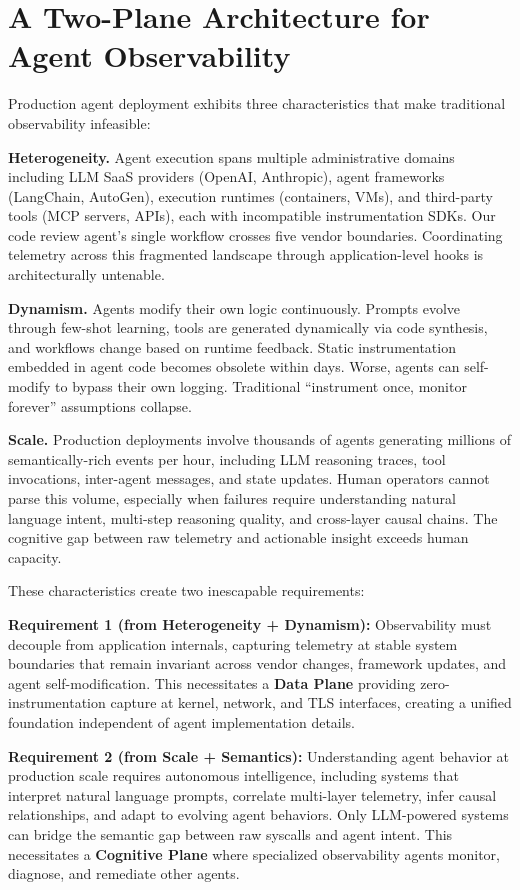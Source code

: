 \documentclass[sigplan,screen,9pt]{acmart}
\begin{document}
\section{A Two-Plane Architecture for Agent Observability}

Production agent deployment exhibits three characteristics that make traditional observability infeasible:

\textbf{Heterogeneity.} Agent execution spans multiple administrative domains including LLM SaaS providers (OpenAI, Anthropic), agent frameworks (LangChain, AutoGen), execution runtimes (containers, VMs), and third-party tools (MCP servers, APIs), each with incompatible instrumentation SDKs. Our code review agent's single workflow crosses five vendor boundaries. Coordinating telemetry across this fragmented landscape through application-level hooks is architecturally untenable.

\textbf{Dynamism.} Agents modify their own logic continuously. Prompts evolve through few-shot learning, tools are generated dynamically via code synthesis, and workflows change based on runtime feedback. Static instrumentation embedded in agent code becomes obsolete within days. Worse, agents can self-modify to bypass their own logging. Traditional ``instrument once, monitor forever'' assumptions collapse.

\textbf{Scale.} Production deployments involve thousands of agents generating millions of semantically-rich events per hour, including LLM reasoning traces, tool invocations, inter-agent messages, and state updates. Human operators cannot parse this volume, especially when failures require understanding natural language intent, multi-step reasoning quality, and cross-layer causal chains. The cognitive gap between raw telemetry and actionable insight exceeds human capacity.

These characteristics create two inescapable requirements:

\textbf{Requirement 1 (from Heterogeneity + Dynamism):} Observability must decouple from application internals, capturing telemetry at stable system boundaries that remain invariant across vendor changes, framework updates, and agent self-modification. This necessitates a \textbf{Data Plane} providing zero-instrumentation capture at kernel, network, and TLS interfaces, creating a unified foundation independent of agent implementation details.

\textbf{Requirement 2 (from Scale + Semantics):} Understanding agent behavior at production scale requires autonomous intelligence, including systems that interpret natural language prompts, correlate multi-layer telemetry, infer causal relationships, and adapt to evolving agent behaviors. Only LLM-powered systems can bridge the semantic gap between raw syscalls and agent intent. This necessitates a \textbf{Cognitive Plane} where specialized observability agents monitor, diagnose, and remediate other agents.
\end{document}
